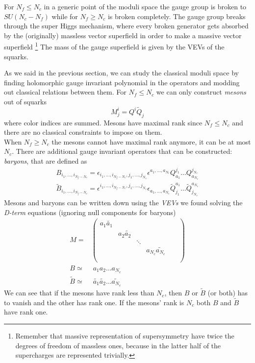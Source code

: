 For $N_f \le N_c$ in a generic point of the moduli space the gauge group is broken to $SU(N_c - N_f)$ while for $N_f \geq N_c$ is broken completely.
The gauge group breaks through the super Higgs mechanism, where every broken generator gets absorbed by the (originally) massless vector superfield in order to make a massive vector superfield \footnote{Remember that massive representation of supersymmetry have twice the degrees of freedom of massless ones, because in the latter half of the supercharges are represented trivially.}
The mass of the gauge superfield is given by the VEVs of the squarks.

As we said in the previous section, we can  study the classical moduli space by finding holomorphic gauge invariant polynomial in the operators and modding out classical relations between them.
For $N_f \le N_c$ we can only construct \emph{mesons} out of squarks
\begin{equation}
  M^i_j = Q^i \tilde{Q}_j
 \end{equation} 
where color indices are summed. 
Mesons have maximal rank since $N_f \le N_c$ and there are no  classical constraints to impose on them. \\
When $N_f \geq N_c$ the mesons cannot have maximal rank anymore, it can be at most $N_c$.
There are additional gauge invariant operators that can be constructed: \emph{baryons}, that are defined as
\begin{align}
 B_{ i_1, \dotsc, i_{N_f - N_c}} = \epsilon_{i_1, \dotsc, i_{N_f - N_c}, j_1 ,\dotsc, j_{N_c}} \epsilon^{a_1 , \dotsc, a_{N_c}} Q^{j_1}_{a_1} \dots Q^{j_{N_c}}_{a_{N_c}}
 \\
 \tilde{B}_{ i_1, \dotsc, i_{N_f - N_c}} = \epsilon^{i_1, \dotsc, i_{N_f - N_c}, j_1 , \dotsc, j_{N_c}} \epsilon_{a_1 , \dotsc, a_{N_c}} \tilde{Q}_{j_1}^{a_1} \dots \tilde{Q}_{j_{N_c}}^{a_{N_c}}
\end{align}
Mesons and baryons can be written down using the \emph{VEVs} we found solving the \emph{D-term} equations (ignoring null components for baryons)
\begin{align}
M =& \begin{pmatrix}
a_1 \tilde{a_1} & & & & & \\
				& a_2 \tilde{a_2}	& 		&		 & & \\
				&				 	& \ddots&		& 	& \\
				&					&		& a_{N_c} \tilde{a_{N_c}} & \\
				& & & & & \\	
\end{pmatrix}
\\
B  \simeq & \;  a_1 a_2 \dots a_{N_c} 
\\
\tilde{B} \simeq & \;  \tilde{a_1} \tilde{a_2}\dots \tilde{a_{N_c}}
\end{align}
We can see that if the mesons have rank less than $N_c$, then $B$ or $\tilde{B}$ (or both) has to vanish and the other has rank one. If the mesons' rank is $N_c$ both $B$ and $\tilde{B}$ have rank one.

